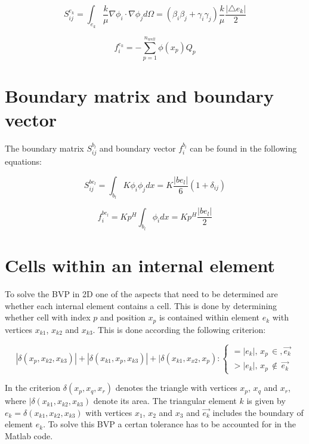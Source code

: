 \documentclass[a4paper]{report}
\begin{document}
\begin{equation}
	S^{e_k}_{ij} = \int_{e_k}\frac{k}{\mu}\nabla\phi_i\cdot\nabla \phi_j d\Omega = (\beta_i\beta_j+\gamma_i\gamma_j)\frac{k}{\mu}\frac{\lvert\triangle e_k\rvert}{2}
\end{equation}

\begin{equation}
	f^{e_k}_i =  -\sum_{p=1}^{n_{well}}\phi(x_p) Q_p
\end{equation}


\section{Boundary matrix and boundary vector}

The boundary matrix $S^{b_l}_{ij}$ and boundary vector $f^{b_l}_i$ can be found in the following equations:

\begin{equation}
	S^{be_l}_{ij} = \int_{b_l} K\phi_i \phi_j dx = K\frac{\lvert be_l\rvert}{6}(1+\delta_{ij})
\end{equation}

\begin{equation}
	f^{be_l}_i = Kp^H\int_{b_l}\phi_i dx = K p^H \frac{\lvert be_l\rvert}{2}
\end{equation}


\section{Cells within an internal element}

To solve the BVP in 2D one of the aspects that need to be determined are whether each internal element contains a cell. This is done by determining whether cell with index $p$ and position $x_p$ is contained within element $e_k$ with vertices $x_{k1}$, $x_{k2}$ and $x_{k3}$. This is done according the following criterion:

\begin{equation}
|\delta(x_p,x_{k2},x_{k3})|+|\delta(x_{k1},x_p,x_{k3})|+|\delta(x_{k1},x_{x2},x_p):
	\begin{cases} 
	=|e_k|,\, x_p\, \in, \vec{e_k}\\ 
	>|e_k|,\, x_p\, \notin\,\vec{e_k}
	\end{cases} 
\end{equation}

In the criterion $\delta(x_p,x_q,x_r)$ denotes the triangle with vertices $x_p$, $x_q$ and $x_r$, where $|\delta(x_{k1},x_{k2},x_{k3})$ denote its area. The triangular element $k$ is given by $e_k=\delta(x_{k1},x_{k2},x_{k3})$ with vertices  $x_1$, $x_2$ and $x_3$ and $\vec{e_k}$ includes the boundary of element $e_k$. To solve this BVP a certan tolerance has to be accounted for in the Matlab code.
\end{document}
